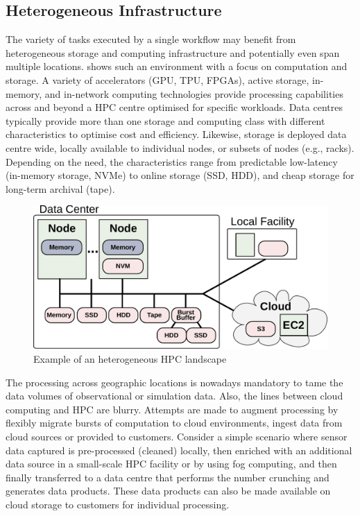 \documentclass[a4paper]{article}
\begin{document}
{{\subsection{Heterogeneous Infrastructure}

The variety of tasks executed by a single workflow may benefit from heterogeneous storage and computing infrastructure and potentially even span multiple locations.
 shows such an environment with a focus on computation and storage.
A variety of accelerators (GPU, TPU, FPGAs), active storage, in-memory, and in-network computing technologies provide processing capabilities across and beyond a HPC centre optimised for specific workloads.
Data centres typically provide more than one storage and computing class with different characteristics to optimise cost and efficiency.
Likewise, storage is deployed data centre wide, locally available to individual nodes, or subsets of nodes (e.g., racks). Depending on the need, the characteristics range from predictable low-latency (in-memory storage, NVMe) to online storage (SSD, HDD), and cheap storage for long-term archival (tape).

\begin{figure}[H]
  \centering
  \includegraphics[width=0.6\columnwidth]{system}
  \caption{Example of an heterogeneous HPC landscape}
  \label{fig:heterogeneous}
\end{figure}

The processing across geographic locations is nowadays mandatory to tame the data volumes of observational or simulation data.
Also, the lines between cloud computing and HPC are blurry. Attempts are made to augment processing by flexibly migrate bursts of computation to cloud environments, ingest data from cloud sources or provided to customers.
Consider a simple scenario where sensor data captured is pre-processed (cleaned) locally, then enriched with an additional data source in a small-scale HPC facility or by using fog computing, and then finally transferred to a data centre that performs the number crunching and generates data products.
These data products can also be made available on cloud storage to customers for individual processing.

}}
\end{document}

